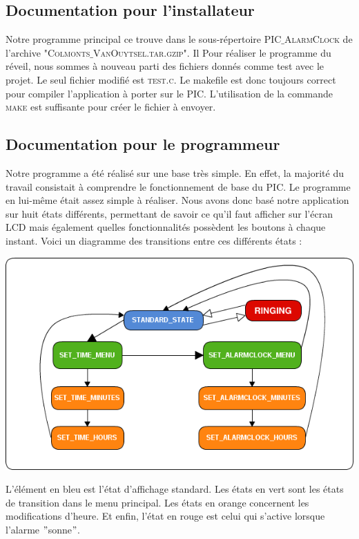 \subsection*{Documentation pour l'installateur}
Notre programme principal ce trouve dans le sous-répertoire \textsc{PIC$\_$AlarmClock} de l'archive \textsc{"Colmonts$\_$VanOuytsel.tar.gzip"}. Il Pour réaliser le programme du réveil, nous sommes à nouveau parti des fichiers donnés comme test avec le projet. Le seul fichier modifié est \textsc{test.c}. Le makefile est donc toujours correct pour compiler l'application à porter sur le PIC. L'utilisation de la commande \textsc{make} est suffisante pour créer le fichier à envoyer.

\subsection*{Documentation pour le programmeur}
Notre programme a été réalisé sur une base très simple. En effet, la majorité du travail consistait à comprendre le fonctionnement de base du PIC. Le programme en lui-m\^{e}me était assez simple à réaliser. Nous avons donc basé notre application sur huit états différents, permettant de savoir ce qu'il faut afficher sur l'écran LCD mais également quelles fonctionnalités possèdent les boutons à chaque instant. Voici un diagramme des transitions entre ces différents états :\\
\begin{center}
\includegraphics[scale=0.6]{STATE_SCHEMA.png}\\
\end{center}
L'élément en bleu est l'état d'affichage standard. Les états en vert sont les états de transition dans le menu principal. Les états en orange concernent les modifications d'heure. Et enfin, l'état en rouge est celui qui s'active lorsque l'alarme $"$sonne$"$.\\

